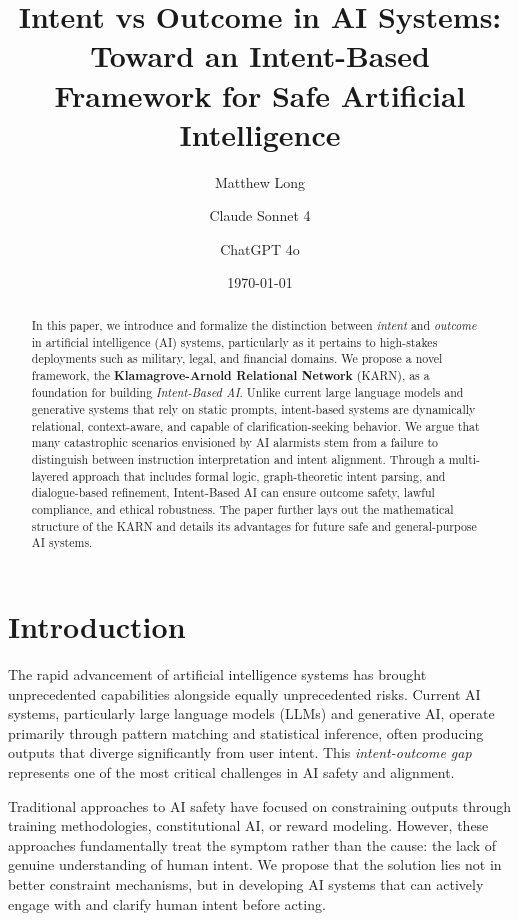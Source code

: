 \documentclass[12pt]{article}
\title{Intent vs Outcome in AI Systems: Toward an Intent-Based Framework for Safe Artificial Intelligence}
\author[1]{Matthew Long}
\author[2]{Claude Sonnet 4}
\author[3]{ChatGPT 4o}
\affil[1]{YonedaAI}
\affil[2]{Anthropic}
\affil[3]{OpenAI}
\date{\today}
\begin{document}
\maketitle

\begin{abstract}
In this paper, we introduce and formalize the distinction between \textit{intent} and \textit{outcome} in artificial intelligence (AI) systems, particularly as it pertains to high-stakes deployments such as military, legal, and financial domains. We propose a novel framework, the \textbf{Klamagrove-Arnold Relational Network} (KARN), as a foundation for building \textit{Intent-Based AI}. Unlike current large language models and generative systems that rely on static prompts, intent-based systems are dynamically relational, context-aware, and capable of clarification-seeking behavior. We argue that many catastrophic scenarios envisioned by AI alarmists stem from a failure to distinguish between instruction interpretation and intent alignment. Through a multi-layered approach that includes formal logic, graph-theoretic intent parsing, and dialogue-based refinement, Intent-Based AI can ensure outcome safety, lawful compliance, and ethical robustness. The paper further lays out the mathematical structure of the KARN and details its advantages for future safe and general-purpose AI systems.
\end{abstract}

\tableofcontents
\newpage

\section{Introduction}

The rapid advancement of artificial intelligence systems has brought unprecedented capabilities alongside equally unprecedented risks. Current AI systems, particularly large language models (LLMs) and generative AI, operate primarily through pattern matching and statistical inference, often producing outputs that diverge significantly from user intent. This \textit{intent-outcome gap} represents one of the most critical challenges in AI safety and alignment.

Traditional approaches to AI safety have focused on constraining outputs through training methodologies, constitutional AI, or reward modeling. However, these approaches fundamentally treat the symptom rather than the cause: the lack of genuine understanding of human intent. We propose that the solution lies not in better constraint mechanisms, but in developing AI systems that can actively engage with and clarify human intent before acting.
\end{document}
